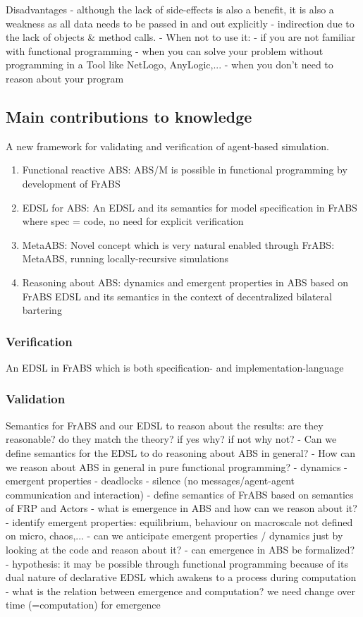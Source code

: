 Disadvantages
- although the lack of side-effects is also a benefit, it is also a weakness as all data needs to be passed in and out explicitly 
- indirection due to the lack of objects \& method calls.
- When not to use it: 
	- if you are not familiar with functional programming
	- when you can solve your problem without programming in a Tool like NetLogo, AnyLogic,...
	- when you don't need to reason about your program

\subsection{Main contributions to knowledge}
A new framework for validating and verification of agent-based simulation.

\begin{enumerate}
	\item Functional reactive ABS: ABS/M is possible in functional programming by development of FrABS
	\item EDSL for ABS: An EDSL and its semantics for model specification in FrABS where spec = code, no need for explicit verification
	\item MetaABS: Novel concept which is very natural enabled through FrABS: MetaABS, running locally-recursive simulations
	\item Reasoning about ABS: dynamics and emergent properties in ABS based on FrABS EDSL and its semantics in the context of decentralized bilateral bartering
\end{enumerate}

\subsubsection{Verification}
An EDSL in FrABS which is both specification- and implementation-language 

\subsubsection{Validation}
Semantics for FrABS and our EDSL to reason about the results: are they reasonable? do they match the theory? if yes why? if not why not?
	- Can we define semantics for the EDSL to do reasoning about ABS in general?
	- How can we reason about ABS in general in pure functional programming?
		- dynamics
		- emergent properties
		- deadlocks
		- silence (no messages/agent-agent communication and interaction)
		- define semantics of FrABS based on semantics of FRP and Actors
		- what is emergence in ABS and how can we reason about it? 
			- identify emergent properties: equilibrium, behaviour on macroscale not defined on micro, chaos,...
			- can we anticipate emergent properties / dynamics just by looking at the code and reason about it?
			- can emergence in ABS be formalized?
				- hypothesis: it may be possible through functional programming because of its dual nature of declarative EDSL which awakens to a process during computation
					- what is the relation between emergence and computation? we need change over time (=computation) for emergence
					
